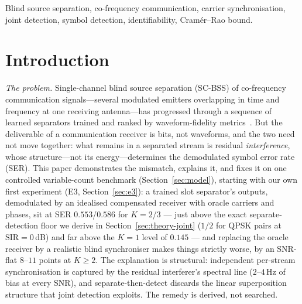 \documentclass[journal]{IEEEtran}
\newcommand{\sir}{\mathrm{SIR}}
\begin{document}
\begin{IEEEkeywords}
Blind source separation, co-frequency communication, carrier
synchronisation, joint detection, symbol detection, identifiability,
Cram\'er--Rao bound.
\end{IEEEkeywords}

\section{Introduction}
\label{sec:intro}

\emph{The problem.} Single-channel blind source
separation (SC-BSS) of co-frequency communication signals---several
modulated emitters overlapping in time and frequency at one receiving
antenna---has progressed through a sequence of learned separators
trained and ranked by waveform-fidelity
metrics~\cite{hou2022single,guo2024single,chen2019deep,ma2023novel,luo2023single,s4unet2026,edsnet2026}.
But the deliverable of a communication receiver is bits, not waveforms,
and the two need not move together: what remains in a separated stream
is residual \emph{interference}, whose structure---not its
energy---determines the demodulated symbol error rate (SER). This paper
demonstrates the mismatch, explains it, and fixes it on one controlled
variable-count benchmark (Section~\ref{sec:model}), starting with our
own first experiment (E3, Section~\ref{sec:e3}): a trained
slot separator's outputs, demodulated by an idealised
compensated receiver with oracle carriers and phases, sit at SER
$0.553$/$0.586$ for $K{=}2$/$3$ --- just above the exact
separate-detection floor we derive in Section~\ref{sec:theory-joint}
($1/2$ for QPSK pairs at $\sir = 0$\,dB) and far above the $K{=}1$
level of $0.145$ --- and replacing the oracle receiver by a realistic
blind synchroniser makes things strictly worse, by an SNR-flat
$8$--$11$ points at $K \geq 2$. The explanation is structural:
independent per-stream synchronisation is
captured by the residual interferer's spectral line ($2$--$4$\,Hz of
bias at every SNR), and separate-then-detect discards the linear
superposition structure that joint detection exploits. The remedy is
derived, not searched.
\end{document}
